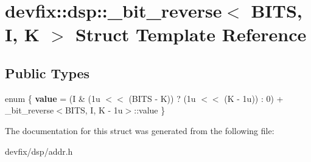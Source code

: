 \hypertarget{structdevfix_1_1dsp_1_1__bit__reverse}{}\section{devfix\+:\+:dsp\+:\+:\+\_\+bit\+\_\+reverse$<$ B\+I\+TS, I, K $>$ Struct Template Reference}
\label{structdevfix_1_1dsp_1_1__bit__reverse}
\subsection*{Public Types}
\begin{DoxyCompactItemize}
\item 
\mbox{\label{structdevfix_1_1dsp_1_1__bit__reverse_a5bcd25bebff16122dc4b09e16617f612}} 
enum \{ {\bfseries value} = (I \& (1u $<$$<$ (B\+I\+TS -\/ K)) ? (1u $<$$<$ (K -\/ 1u)) \+: 0) + \+\_\+bit\+\_\+reverse$<$B\+I\+TS, I, K -\/ 1u$>$\+:\+:value
 \}
\end{DoxyCompactItemize}


The documentation for this struct was generated from the following file\+:\begin{DoxyCompactItemize}
\item 
devfix/dsp/addr.\+h\end{DoxyCompactItemize}
